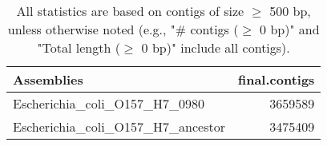 \documentclass[12pt,a4paper]{article}
\begin{document}
\begin{table}[ht]
\begin{center}
\caption{All statistics are based on contigs of size $\geq$ 500 bp, unless otherwise noted (e.g., "\# contigs ($\geq$ 0 bp)" and "Total length ($\geq$ 0 bp)" include all contigs).}
\begin{tabular}{|l*{1}{|r}|}
\hline
Assemblies & final.contigs \\ \hline
Escherichia\_coli\_O157\_H7\_0980 & 3659589 \\ \hline
Escherichia\_coli\_O157\_H7\_ancestor & 3475409 \\ \hline
\end{tabular}
\end{center}
\end{table}
\end{document}
